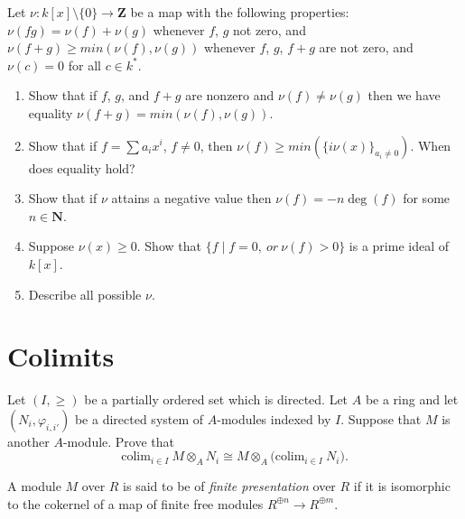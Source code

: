 \begin{exercise}
\label{exercise-valuation}
Let $\nu : k[x]\setminus \{0\}  \to {\mathbf Z}$ be a map
with the following properties: $\nu(fg) = \nu(f) + \nu(g)$ whenever
$f$, $g$ not zero, and  $\nu(f + g) \geq min(\nu(f), \nu(g))$ whenever
$f$, $g$, $f + g$ are not zero, and $\nu(c) = 0$ for all $c\in k^*$.
\begin{enumerate}
\item Show that if $f$, $g$, and $f + g$ are nonzero and
$\nu(f) \not= \nu(g)$ then we have equality $\nu(f + g) = min(\nu(f), \nu(g))$.
\item Show that if $f = \sum a_i x^i$, $f\not = 0$, then
$\nu(f) \geq min(\{i\nu(x)\}_{a_i\not = 0})$. When does equality hold?
\item Show that if $\nu$ attains a negative value then
$\nu(f) = -n \deg(f)$ for some $n\in {\mathbf N}$.
\item Suppose $\nu(x) \geq 0$. Show that
$\{f \mid f = 0, \ or\ \nu(f) > 0\}$ is a prime ideal of $k[x]$.
\item Describe all possible $\nu$.
\end{enumerate}
\end{exercise}













\section{Colimits}
\label{section-colimits}

\begin{exercise}
\label{exercise-colimit-tensor}
Let $(I, \geq)$ be a partially ordered set which is directed.
Let $A$ be a ring and let $(N_i, \varphi_{i, i'})$ be a directed system of
$A$-modules indexed by $I$. Suppose that $M$ is another $A$-module. Prove
that
$$
\text{colim}_{i\in I}\ M\otimes_A N_i\cong
M\otimes_A \Big( \text{colim}_{i\in I}\ N_i\Big).
$$
\end{exercise}

\begin{definition}
\label{definition-finite-presentation}
A module $M$ over $R$ is said to be of {\it finite presentation} over
$R$ if it  is isomorphic to the cokernel of a map of finite free modules
$ R^{\oplus n} \to R^{\oplus m}$.
\end{definition}

